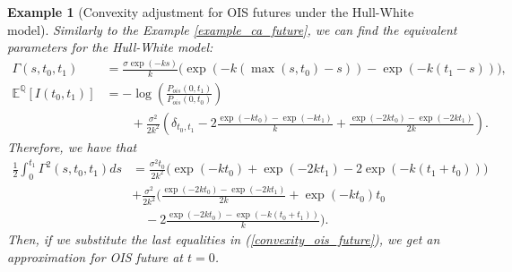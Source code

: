 \documentclass[a4paper,10pt]{article}
\newtheorem{example}[theorem]{Example}
\newcommand{\1}{\mathbf{1}}
\begin{document}
\begin{example}[Convexity adjustment for OIS futures under the Hull-White model]\label{example_convexity_hw_ois}
Similarly to the Example \ref{example_ca_future}, we can find the equivalent parameters for the Hull-White model: 
\begin{align*}
\Gamma(s,t_0,t_1) &= \frac{\sigma \exp(-ks)}{k}\biggl(\exp(-k(\max(s,t_0) - s)) - \exp(-k(t_1-s))\biggr),\\
\mathbb{E}^{\mathbb{Q}}\left[I(t_0,t_1)\right]&=-\log\left(\frac{P_{ois}(0,t_1)}{P_{ois}(0,t_0)}\right)\\
& \text{ }\text{ }\text{ }+ \frac{\sigma^{2}}{2k^{2}}\left(\delta_{t_0,t_1} - 2 \frac{\exp(-kt_0) - \exp(-kt_1)}{k} + \frac{\exp(-2kt_0) - \exp(-2kt_1)}{2k}  \right).
\end{align*}
Therefore, we have that
\begin{align*}
\frac{1}{2}\int_{0}^{t_1} \Gamma^{2}(s,t_0,t_1) ds &= \frac{\sigma^{2}t_0}{2k^{2}} \biggl( \exp(-kt_0) + \exp(-2kt_1) - 2 \exp(-k(t_1+t_0)) \biggr)\\  
&+ \frac{\sigma^{2}}{2k^{2}} \biggl(\frac{\exp(-2kt_0) - \exp(-2kt_1)}{2k}  + \exp(-kt_0)t_0 \\
&\quad - 2 \frac{\exp(-2kt_0) - \exp(-k(t_0 + t_1))}{k}  \biggr).
\end{align*}
Then, if we substitute the last equalities in (\ref{convexity_ois_future}), we get an approximation for OIS future at $t=0$.\\


\end{example}
\end{document}
